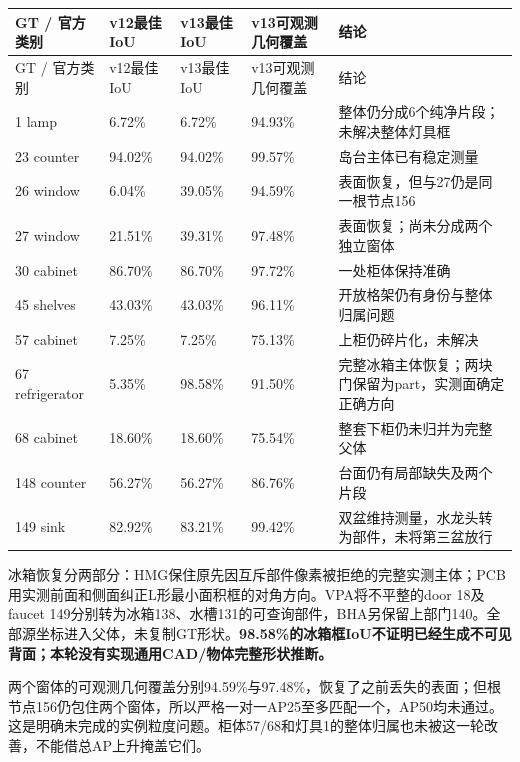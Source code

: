 \documentclass[UTF8,fontset=fandol]{ctexart}
\begin{document}
{\small
\begin{longtable}{|p{}|p{}|p{}|p{}|p{}|}
\hline
GT / 官方类别 & v12最佳IoU & v13最佳IoU & v13可观测几何覆盖 & 结论 \\ \hline
\endfirsthead
\hline
GT / 官方类别 & v12最佳IoU & v13最佳IoU & v13可观测几何覆盖 & 结论 \\ \hline
\endhead
1 lamp & 6.72\% & 6.72\% & 94.93\% & 整体仍分成6个纯净片段；未解决整体灯具框 \\ \hline
23 counter & 94.02\% & 94.02\% & 99.57\% & 岛台主体已有稳定测量 \\ \hline
26 window & 6.04\% & 39.05\% & 94.59\% & 表面恢复，但与27仍是同一根节点156 \\ \hline
27 window & 21.51\% & 39.31\% & 97.48\% & 表面恢复；尚未分成两个独立窗体 \\ \hline
30 cabinet & 86.70\% & 86.70\% & 97.72\% & 一处柜体保持准确 \\ \hline
45 shelves & 43.03\% & 43.03\% & 96.11\% & 开放格架仍有身份与整体归属问题 \\ \hline
57 cabinet & 7.25\% & 7.25\% & 75.13\% & 上柜仍碎片化，未解决 \\ \hline
67 refrigerator & 5.35\% & 98.58\% & 91.50\% & 完整冰箱主体恢复；两块门保留为part，实测面确定正确方向 \\ \hline
68 cabinet & 18.60\% & 18.60\% & 75.54\% & 整套下柜仍未归并为完整父体 \\ \hline
148 counter & 56.27\% & 56.27\% & 86.76\% & 台面仍有局部缺失及两个片段 \\ \hline
149 sink & 82.92\% & 83.21\% & 99.42\% & 双盆维持测量，水龙头转为部件，未将第三盆放行 \\ \hline
\end{longtable}
}

冰箱恢复分两部分：HMG保住原先因互斥部件像素被拒绝的完整实测主体；PCB用实测前面和侧面纠正L形最小面积框的对角方向。VPA将不平整的door 18及faucet 149分别转为冰箱138、水槽131的可查询部件，BHA另保留上部门140。全部源坐标进入父体，未复制GT形状。\textbf{98.58\%的冰箱框IoU不证明已经生成不可见背面；本轮没有实现通用CAD/物体完整形状推断。}



两个窗体的可观测几何覆盖分别94.59\%与97.48\%，恢复了之前丢失的表面；但根节点156仍包住两个窗体，所以严格一对一AP25至多匹配一个，AP50均未通过。这是明确未完成的实例粒度问题。柜体57/68和灯具1的整体归属也未被这一轮改善，不能借总AP上升掩盖它们。
\end{document}
